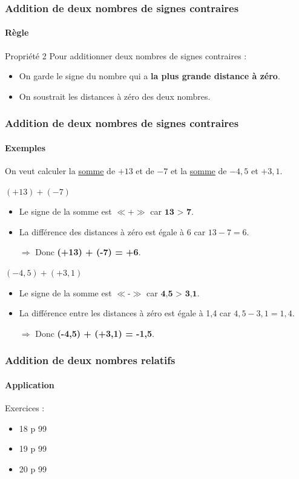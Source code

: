 \documentclass{beamer}
\begin{document}
\begin{frame}
	\frametitle{Addition de deux nombres de signes contraires}  
	\framesubtitle{Règle}	
	
	\begin{block}{Propriété 2}
		Pour additionner deux nombres de signes contraires :
		\begin{itemize}
			\item On garde le signe du nombre qui a \textbf{la plus grande distance à zéro}. 
			\item On soustrait les distances à zéro des deux nombres. 
		\end{itemize}
	\end{block}	
	
\end{frame}

\begin{frame}
	\frametitle{Addition de deux nombres de signes contraires}  
	\framesubtitle{Exemples}	
	
	On veut calculer la \underline{somme} de $ +13 $ et de $ -7 $ et la \underline{somme} de $ -4,5 $ et $ +3,1 $.\pause
	
	\begin{exampleblock}{$ (+13) + (-7) $}
		\begin{itemize} %
			\item Le signe de la somme est $ \ll \textbf{+} \gg $ car $\textbf{13 > 7}$. %
			\item La différence des distances à zéro est égale à 6 
			car $ 13 - 7 = 6 $. %
			\item[$\Rightarrow$] Donc \textbf{(+13) + (-7) = +6}.\pause
		\end{itemize}
	\end{exampleblock}
	
	\begin{exampleblock}{$ (-4,5) + (+3,1) $}
		\begin{itemize}
			\item Le signe de la somme est $ \ll \textbf{-} \gg $ car $\textbf{4,5 > 3,1}$.
			\item La différence entre les distances à zéro est égale à 1,4 
			car $ 4,5 - 3,1 = 1,4 $.
			\item[$\Rightarrow$] Donc \textbf{(-4,5) + (+3,1) = -1,5}.
		\end{itemize}
	\end{exampleblock}
\end{frame}


\begin{frame}
	\frametitle{Addition de deux nombres relatifs}  
	\framesubtitle{Application}	
	
	Exercices :
	\begin{itemize}
		\item 18 p 99
		\item 19 p 99
		\item 20 p 99
	\end{itemize}
\end{frame}
\end{document}
